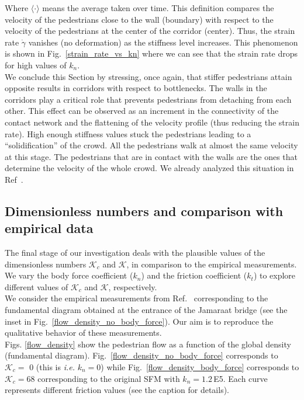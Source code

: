 \documentclass[preprint,12pt]{elsarticle}
\begin{document}
Where $\langle \cdot \rangle$ means the average taken over time. This definition
compares the velocity of the pedestrians close to the wall (boundary) with
respect to the velocity of the pedestrians at the center of the corridor
(center). Thus, the strain rate $\dot{\gamma}$ vanishes (no deformation) as the
stiffness level increases. This phenomenon is shown in
Fig.~\ref{strain_rate_vs_kn} where we can see that the strain rate drops for
high values of $k_n$. \\


We conclude this Section by stressing, once again, that stiffer pedestrians
attain opposite results in corridors with respect to bottlenecks. The walls in
the corridors play a critical role that prevents pedestrians from detaching from
each other. This effect can be observed as an increment in the connectivity
of the contact network and the flattening of the velocity profile (thus reducing
the strain rate). High enough stiffness values stuck the pedestrians
leading to a ``solidification'' of the crowd. All the pedestrians walk at almost
the same velocity at this stage. The pedestrians that are in contact with the
walls are the ones that determine the velocity of the whole crowd. We already
analyzed this situation in Ref~\cite{dorso_2019}. \\

\subsection{\label{Dimensionless}Dimensionless numbers and comparison
 with empirical data}


The final stage of our investigation deals with the plausible values of the
dimensionless numbers $\mathcal{K}_c$ and $\mathcal{K}$, in comparison to the
empirical measurements. We vary the body force coefficient ($k_n$) and the
friction coefficient ($k_t$) to explore different values of $\mathcal{K}_c$ and
$\mathcal{K}$, respectively.\\

We consider the empirical measurements from Ref.~\cite{helbing_2007}
corresponding to the fundamental diagram obtained at the entrance of the
Jamaraat bridge (see the inset in Fig.~\ref{flow_density_no_body_force}). Our
aim is to reproduce the qualitative behavior of these measurements.\\

Figs. \ref{flow_density} show the pedestrian flow as a function of the global
density (fundamental diagram). Fig.~\ref{flow_density_no_body_force} corresponds
to $\mathcal{K}_c=$ 0 (this is \textit{i.e.} $k_n=0$) while
Fig.~\ref{flow_density_body_force} corresponds to $\mathcal{K}_c=$68
corresponding to the original SFM with $k_n=1.2\,$E5. Each curve represents
different friction values (see the caption for details).\\
\end{document}
